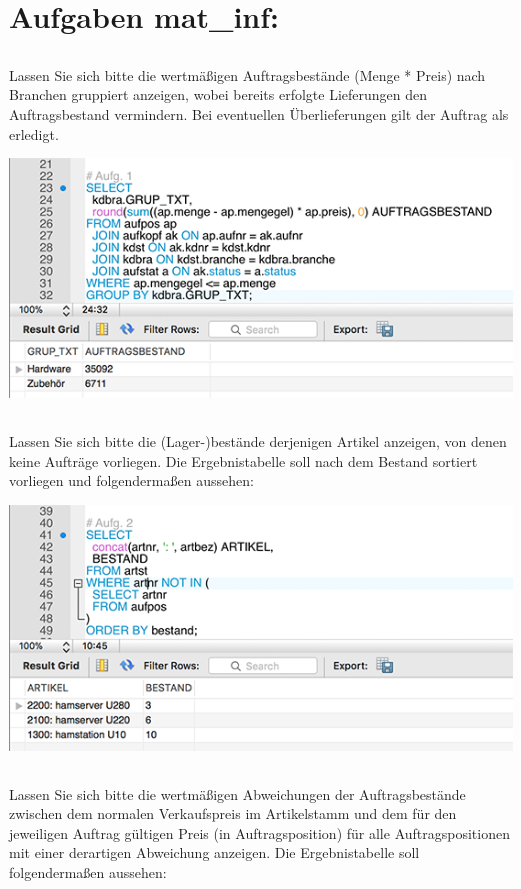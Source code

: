 \documentclass{article}
\begin{document}
\section* {Aufgaben mat\_inf:}
\subsection{}
Lassen Sie sich bitte die wertmäßigen Auftragsbestände (Menge * Preis) nach Branchen gruppiert anzeigen, wobei bereits erfolgte Lieferungen den Auftragsbestand vermindern. Bei eventuellen Überlieferungen gilt der Auftrag als erledigt.

\includegraphics{mat_inf1}

\subsection{}
Lassen Sie sich bitte die (Lager-)bestände derjenigen Artikel anzeigen, von denen keine Aufträge vorliegen. Die Ergebnistabelle soll nach dem Bestand sortiert vorliegen und folgendermaßen aussehen:

\includegraphics{mat_inf2}

\subsection{}
Lassen Sie sich bitte die wertmäßigen Abweichungen der Auftragsbestände zwischen dem normalen Verkaufspreis im Artikelstamm und dem für den jeweiligen Auftrag gültigen Preis (in Auftragsposition) für alle Auftragspositionen mit einer derartigen Abweichung anzeigen. Die Ergebnistabelle soll folgendermaßen aussehen:
\end{document}
